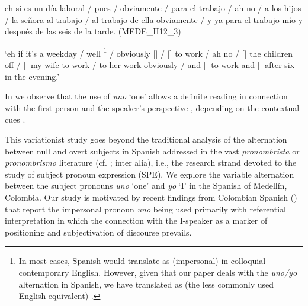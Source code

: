 \documentclass[output=paper]{langscibook}
\begin{document}
\eanoraggedright\label{ex:orozco:1}
\begin{otherlanguage}{spanish}
eh si es un día laboral /  pues    /  obviamente \ExHighlight{[∅]}   /  \ExHighlight{[∅]}   para el trabajo /  ah no /  \ExHighlight{[∅]}  a los hijos /  \ExHighlight{[∅]}  la señora al trabajo /  al trabajo de ella obviamente /  y \ExHighlight{[∅]}   ya para el trabajo mío y \ExHighlight{[∅]}   después de las seis de la tarde.  (MEDE\_H12\_3)
\end{otherlanguage}
\glt ‘eh if it’s a weekday /  well \footnote{In most cases, Spanish  would translate as (impersonal)  in colloquial contemporary English. However, given that our paper deals with the \textit{uno/yo} alternation in Spanish, we have translated  as (the less commonly used English equivalent) .}   /  obviously []  /  []  to work /  ah no /  []  the children off /  []  my wife to work /  to her work obviously /  and []  to work and []  after six in the evening.’  
\z 


In  we observe that the use of \textit{uno} ‘one’ allows a definite reading in connection with the first person and the speaker’s perspective \citep[19]{Haverkate1985}, depending on the contextual cues \citep{Gelabert-Desnoyer2008}. 



This variationist study goes beyond the traditional analysis of the alternation between null and overt subjects in Spanish addressed in the vast \textit{pronombrista} or \textit{pronombrismo} literature (cf. \citealt{CarvalhoShin2015, OrozcoHurtado2021, OtheguyZentella2012}; inter alia), i.e., the research strand devoted to the study of subject pronoun expression (SPE). We explore the variable alternation between the subject pronouns \textit{uno} ‘one’ and \textit{yo} ‘I’ in the Spanish of Medellín, Colombia. Our study is motivated by recent findings from Colombian Spanish (\citealt{Hurtado2015, HurtadoGutiérrez-Rivas2016, HurtadoOrtega-Santos2019, OrozcoHurtado2021,OrozcoHurtado2021b}) that report the impersonal pronoun \textit{uno} being used primarily with referential interpretation in which the connection with the I-speaker as a marker of positioning and subjectivation of discourse prevails.
\end{document}
